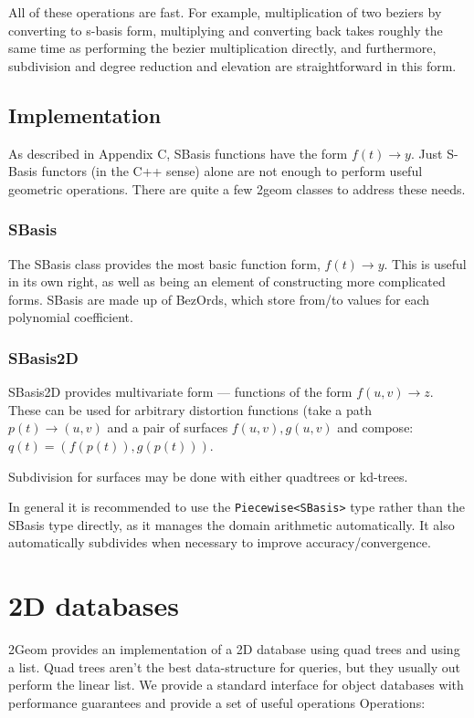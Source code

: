 \documentclass[openany]{book}
\newcommand{\code}[1]{\textsf{#1}}
\begin{document}
All of these operations are fast.  For example, multiplication of two
beziers by converting to s-basis form, multiplying and converting back
takes roughly the same time as performing the bezier multiplication
directly, and furthermore, subdivision and degree reduction and
elevation are straightforward in this form.

\section{Implementation}
As described in Appendix C, SBasis functions have the form $f(t) \rightarrow y$.
Just S-Basis functors (in the C++ sense) alone are not enough to perform
useful geometric operations.  There are quite a few 2geom classes to
address these needs.

\subsection{SBasis}
The \code{SBasis} class provides the most basic function form,
$f(t) \rightarrow y$.  This is useful in its own right, as well as being an
element of constructing more complicated forms.  \code{SBasis} are made
up of \code{BezOrd}s, which store from/to values for each polynomial
coefficient.

\subsection{SBasis2D}
SBasis2D provides multivariate form --- functions of the form
$f(u,v) \rightarrow z$.  These can be used for arbitrary distortion
functions (take a path $p(t) \rightarrow (u,v)$ and a pair of surfaces
$f(u,v),g(u,v)$ and compose: $q(t) = (f(p(t)), g(p(t)))$.

Subdivision for surfaces may be done with either quadtrees or kd-trees.

In general it is recommended to use the \verb|Piecewise<SBasis>| type rather than the SBasis type directly, as it manages the domain arithmetic automatically.  It also automatically subdivides when necessary to improve accuracy/convergence.

\chapter{2D databases}

2Geom provides an implementation of a 2D database using quad trees and
using a list.  Quad trees aren't the best data-structure for queries,
but they usually out perform the linear list.  We provide a
standard interface for object databases with performance guarantees
and provide a set of useful operations Operations:
\end{document}
